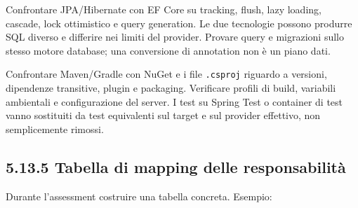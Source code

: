 \documentclass[
  italian,
  10pt,
]{book}
\begin{document}
Confrontare JPA/Hibernate con EF Core su tracking, flush, lazy loading,
cascade, lock ottimistico e query generation. Le due tecnologie possono
produrre SQL diverso e differire nei limiti del provider. Provare query
e migrazioni sullo stesso motore database; una conversione di annotation
non è un piano dati.

Confrontare Maven/Gradle con NuGet e i file \texttt{.csproj} riguardo a
versioni, dipendenze transitive, plugin e packaging. Verificare profili
di build, variabili ambientali e configurazione del server. I test su
Spring Test o container di test vanno sostituiti da test equivalenti sul
target e sul provider effettivo, non semplicemente rimossi.

\subsection{5.13.5 Tabella di mapping delle
responsabilità}\label{tabella-di-mapping-delle-responsabilituxe0}

Durante l'assessment costruire una tabella concreta. Esempio:
\end{document}

